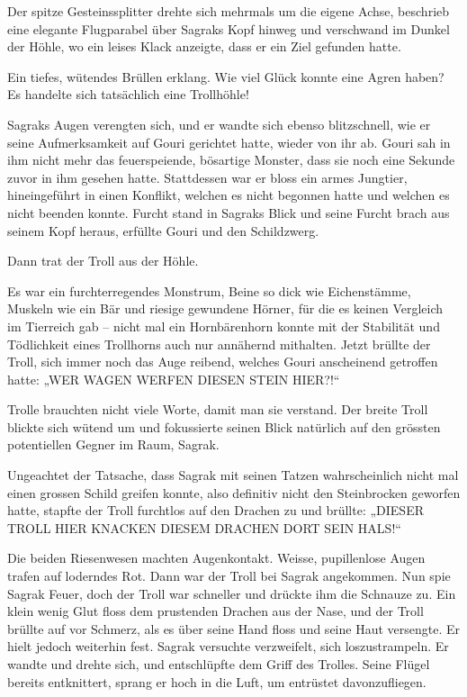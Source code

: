 \documentclass[10pt, a4paper, oneside]{book}
\begin{document}
Der spitze Gesteinssplitter drehte sich mehrmals um die eigene Achse, beschrieb eine elegante Flugparabel über Sagraks Kopf hinweg und verschwand im Dunkel der Höhle, wo ein leises Klack anzeigte, dass er ein Ziel gefunden hatte.

Ein tiefes, wütendes Brüllen erklang. Wie viel Glück konnte eine Agren haben? Es handelte sich tatsächlich eine Trollhöhle!

Sagraks Augen verengten sich, und er wandte sich ebenso blitzschnell, wie er seine Aufmerksamkeit auf Gouri gerichtet hatte, wieder von ihr ab. Gouri sah in ihm nicht mehr das feuerspeiende, bösartige Monster, dass sie noch eine Sekunde zuvor in ihm gesehen hatte. Stattdessen war er bloss ein armes Jungtier, hineingeführt in einen Konflikt, welchen es nicht begonnen hatte und welchen es nicht beenden konnte. Furcht stand in Sagraks Blick und seine Furcht brach aus seinem Kopf heraus, erfüllte Gouri und den Schildzwerg.

Dann trat der Troll aus der Höhle.

Es war ein furchterregendes Monstrum, Beine so dick wie Eichenstämme, Muskeln wie ein Bär und riesige gewundene Hörner, für die es keinen Vergleich im Tierreich gab – nicht mal ein Hornbärenhorn konnte mit der Stabilität und Tödlichkeit eines Trollhorns auch nur annähernd mithalten. Jetzt brüllte der Troll, sich immer noch das Auge reibend, welches Gouri anscheinend getroffen hatte: „WER WAGEN WERFEN DIESEN STEIN HIER?!“

Trolle brauchten nicht viele Worte, damit man sie verstand. Der breite Troll blickte sich wütend um und fokussierte seinen Blick natürlich auf den grössten potentiellen Gegner im Raum, Sagrak.

Ungeachtet der Tatsache, dass Sagrak mit seinen Tatzen wahrscheinlich nicht mal einen grossen Schild greifen konnte, also definitiv nicht den Steinbrocken geworfen hatte, stapfte der Troll furchtlos auf den Drachen zu und brüllte: „DIESER TROLL HIER KNACKEN DIESEM DRACHEN DORT SEIN HALS!“

Die beiden Riesenwesen machten Augenkontakt. Weisse, pupillenlose Augen trafen auf loderndes Rot. Dann war der Troll bei Sagrak angekommen. Nun spie Sagrak Feuer, doch der Troll war schneller und drückte ihm die Schnauze zu. Ein klein wenig Glut floss dem prustenden Drachen aus der Nase, und der Troll brüllte auf vor Schmerz, als es über seine Hand floss und seine Haut versengte. Er hielt jedoch weiterhin fest. Sagrak versuchte verzweifelt, sich loszustrampeln. Er wandte und drehte sich, und entschlüpfte dem Griff des Trolles. Seine Flügel bereits entknittert, sprang er hoch in die Luft, um entrüstet davonzufliegen.
\end{document}

